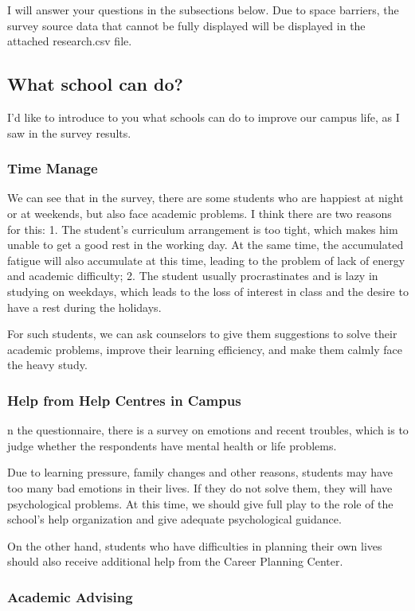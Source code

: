 \documentclass{article}
\begin{document}
I will answer your questions in the subsections below. Due to space barriers, the survey source data that cannot be fully displayed will be displayed in the attached research.csv file.
\subsection{ What school can do?}
I'd like to introduce to you what schools can do to improve our campus life, as I saw in the survey results.
\subsubsection{Time Manage}
We can see that in the survey, there are some students who are happiest at night or at weekends, but also face academic problems. I think there are two reasons for this: 1. The student's curriculum arrangement is too tight, which makes him unable to get a good rest in the working day. At the same time, the accumulated fatigue will also accumulate at this time, leading to the problem of lack of energy and academic difficulty; 2. The student usually procrastinates and is lazy in studying on weekdays, which leads to the loss of interest in class and the desire to have a rest during the holidays.

For such students, we can ask counselors to give them suggestions to solve their academic problems, improve their learning efficiency, and make them calmly face the heavy study.
\subsubsection{Help from Help Centres in Campus}

n the questionnaire, there is a survey on emotions and recent troubles, which is to judge whether the respondents have mental health or life problems.

Due to learning pressure, family changes and other reasons, students may have too many bad emotions in their lives. If they do not solve them, they will have psychological problems. At this time, we should give full play to the role of the school's help organization and give adequate psychological guidance.

On the other hand, students who have difficulties in planning their own lives should also receive additional help from the Career Planning Center.

\subsubsection{Academic Advising}
\end{document}
